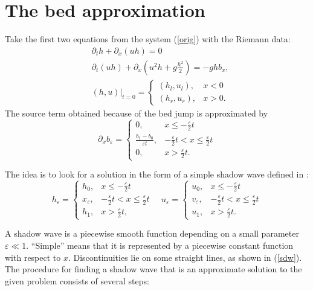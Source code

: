 \documentclass{article}
\theoremstyle{plain}
\theoremstyle{definition}
\theoremstyle{remark}
\begin{document}
\section{The bed approximation}

Take the first two equations from the system (\ref{orig}) with the
Riemann data:
\begin{equation} \label{sys}
\begin{split}
& \partial_{t}h + \partial_{x}(uh) = 0 \\
& \partial_{t}(uh) + \partial_{x}\left( u^{2}h + g\frac{h^{2}}{2} \right) = - ghb_{x}, \\
& (h,u)|_{t=0} = \begin{cases}
(h_{l},u_{l}), & x < 0 \\
(h_{r},u_{r}), & x > 0. 
\end{cases}
\end{split}
\end{equation}
The source term obtained because of the bed jump is approximated by
\[\partial_{x}b_{\varepsilon} = \begin{cases}
0, &  x \leq - \frac{\varepsilon}{2}t \\
\frac{b_{1} - b_{0}}{\varepsilon t}, &  - \frac{\varepsilon}{2}t < x \leq \frac{\varepsilon}{2}t \\
0, &  x > \frac{\varepsilon}{2}t. 
\end{cases}\]

The idea is to look for a solution in the form of a simple shadow wave
defined in \cite{MN2010}:
\begin{equation} \label{sdw}
h_{\varepsilon} = \begin{cases}
h_{0}, &  x \leq - \frac{\varepsilon}{2}t \\
x_{\varepsilon}, & - \frac{\varepsilon}{2}t < x 
\leq \frac{\varepsilon}{2}t \\
h_{1}, &  x > \frac{\varepsilon}{2}t, 
\end{cases} \quad u_{\varepsilon} = \begin{cases}
u_{0}, & x \leq - \frac{\varepsilon}{2}t \\
v_{\varepsilon}, &  - \frac{\varepsilon}{2}t 
< x \leq \frac{\varepsilon}{2}t \\
u_{1}, &  x > \frac{\varepsilon}{2}t. 
\end{cases} 
\end{equation}

A shadow wave is a piecewise smooth function depending on a
small parameter $\varepsilon \ll 1$. ``Simple'' means 
that it is represented by a piecewise constant function
with respect to $x$.
Discontinuities lie on some straight lines, as shown in (\ref{sdw}). 
The procedure for finding a shadow wave that is an approximate solution
to the given problem consists of several steps:
\medskip
\end{document}
